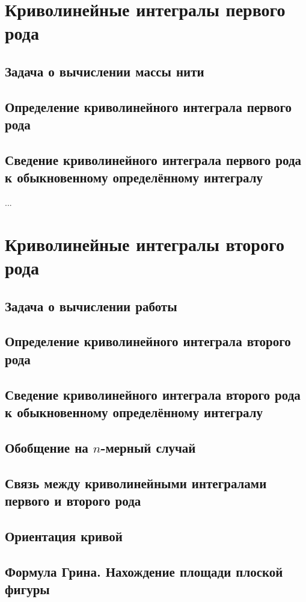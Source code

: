 \section{Криволинейные интегралы первого рода}
\subsection{Задача о вычислении массы нити}
\subsection{Определение криволинейного интеграла первого рода}
\subsection{Сведение криволинейного интеграла первого рода к обыкновенному определённому интегралу}
...

\section{Криволинейные интегралы второго рода}
\subsection{Задача о вычислении работы}
\subsection{Определение криволинейного интеграла второго рода}
\subsection{Сведение криволинейного интеграла второго рода к обыкновенному определённому интегралу}
\subsection{Обобщение на $n$-мерный случай}
\subsection{Связь между криволинейными интегралами первого и второго рода}
\subsection{Ориентация кривой}
\subsection{Формула Грина. Нахождение площади плоской фигуры}
